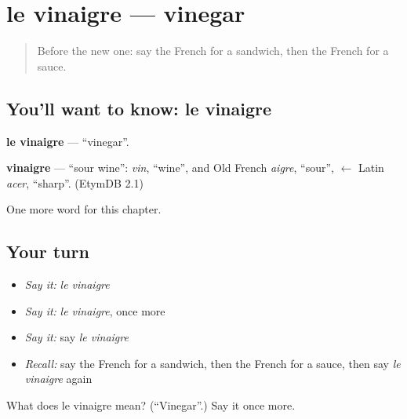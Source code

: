 \section[le vinaigre]{le vinaigre — vinegar}

\label{lesson:FR-C122-vinaigre}



\begin{quote}
Before the new one: say the French for a sandwich, then the French for a sauce.
\end{quote}

\subsection*{You'll want to know: le vinaigre}
\textbf{le vinaigre} — \textquotedblleft{}vinegar\textquotedblright{}.

\begin{cousinweb}
\textbf{vinaigre} — \textquotedblleft{}sour wine\textquotedblright{}: \emph{vin}, \textquotedblleft{}wine\textquotedblright{}, and Old French \emph{aigre}, \textquotedblleft{}sour\textquotedblright{}, $\leftarrow$ Latin \emph{acer}, \textquotedblleft{}sharp\textquotedblright{}. (EtymDB 2.1)
\end{cousinweb}

\begin{grammarlens}[title={What you've built}]
One more word for this chapter.
\end{grammarlens}

\subsection*{Your turn}
\begin{itemize}
\raggedright
  \item \emph{Say it:} \emph{le vinaigre}
  \item \emph{Say it:} \emph{le vinaigre}, once more
  \item \emph{Say it:} say \emph{le vinaigre}
  \item \emph{Recall:} say the French for a sandwich, then the French for a sauce, then say \emph{le vinaigre} again
\end{itemize}

\begin{tcolorbox}[breakable,colback=teal!4,colframe=teal!35!black,title={Before you move on}]
What does le vinaigre mean? (\textquotedblleft{}Vinegar\textquotedblright{}.) Say it once more.
\end{tcolorbox}

